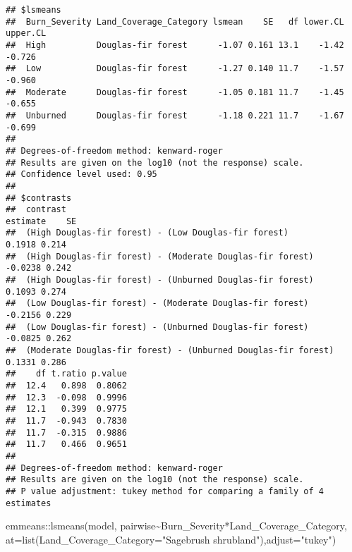\documentclass[
]{article}
\newenvironment{Shaded}{\begin{snugshade}}{\end{snugshade}}
\newcommand{\AttributeTok}[1]{\textcolor[rgb]{0.77,0.63,0.00}{#1}}
\newcommand{\FunctionTok}[1]{\textcolor[rgb]{0.00,0.00,0.00}{#1}}
\newcommand{\NormalTok}[1]{#1}
\newcommand{\SpecialCharTok}[1]{\textcolor[rgb]{0.00,0.00,0.00}{#1}}
\newcommand{\StringTok}[1]{\textcolor[rgb]{0.31,0.60,0.02}{#1}}
\begin{document}
\begin{verbatim}
## $lsmeans
##  Burn_Severity Land_Coverage_Category lsmean    SE   df lower.CL upper.CL
##  High          Douglas-fir forest      -1.07 0.161 13.1    -1.42   -0.726
##  Low           Douglas-fir forest      -1.27 0.140 11.7    -1.57   -0.960
##  Moderate      Douglas-fir forest      -1.05 0.181 11.7    -1.45   -0.655
##  Unburned      Douglas-fir forest      -1.18 0.221 11.7    -1.67   -0.699
## 
## Degrees-of-freedom method: kenward-roger 
## Results are given on the log10 (not the response) scale. 
## Confidence level used: 0.95 
## 
## $contrasts
##  contrast                                                      estimate    SE
##  (High Douglas-fir forest) - (Low Douglas-fir forest)            0.1918 0.214
##  (High Douglas-fir forest) - (Moderate Douglas-fir forest)      -0.0238 0.242
##  (High Douglas-fir forest) - (Unburned Douglas-fir forest)       0.1093 0.274
##  (Low Douglas-fir forest) - (Moderate Douglas-fir forest)       -0.2156 0.229
##  (Low Douglas-fir forest) - (Unburned Douglas-fir forest)       -0.0825 0.262
##  (Moderate Douglas-fir forest) - (Unburned Douglas-fir forest)   0.1331 0.286
##    df t.ratio p.value
##  12.4   0.898  0.8062
##  12.3  -0.098  0.9996
##  12.1   0.399  0.9775
##  11.7  -0.943  0.7830
##  11.7  -0.315  0.9886
##  11.7   0.466  0.9651
## 
## Degrees-of-freedom method: kenward-roger 
## Results are given on the log10 (not the response) scale. 
## P value adjustment: tukey method for comparing a family of 4 estimates
\end{verbatim}

\begin{Shaded}
\begin{Highlighting}[]
\NormalTok{emmeans}\SpecialCharTok{::}\FunctionTok{lsmeans}\NormalTok{(model, pairwise}\SpecialCharTok{\textasciitilde{}}\NormalTok{Burn\_Severity}\SpecialCharTok{*}\NormalTok{Land\_Coverage\_Category, }\AttributeTok{at=}\FunctionTok{list}\NormalTok{(}\AttributeTok{Land\_Coverage\_Category=}\StringTok{"Sagebrush shrubland"}\NormalTok{),}\AttributeTok{adjust=}\StringTok{"tukey"}\NormalTok{)}
\end{Highlighting}
\end{Shaded}
\end{document}
